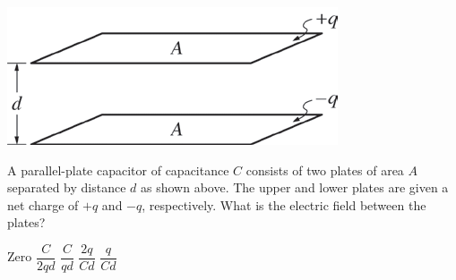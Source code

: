 \begin{center}
\includegraphics[scale=0.5]{images/img-008-020.png}
\end{center}

\begin{questions}\setcounter{question}{25}\question
A parallel-plate capacitor of capacitance $C$ consists of two plates of area $A$ separated by distance $d$ as shown above. The upper and lower plates are given a net charge of $+q$ and $-q$, respectively. What is the electric field between the plates?

\begin{oneparchoices}
\choice Zero
\choice $\dfrac{C}{2 q d}$
\choice $\dfrac{C}{q d}$
\choice $\dfrac{2 q}{C d}$
\choice $\dfrac{q}{C d}$
\end{oneparchoices}\end{questions}

